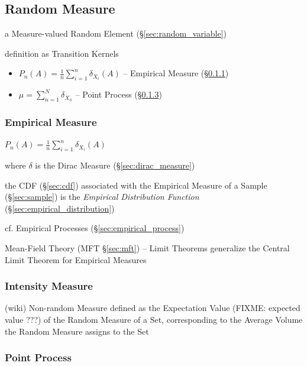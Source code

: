 \subsection{Random Measure}\label{sec:random_measure}

a Measure-valued Random Element (\S\ref{sec:random_variable})

definition as Transition Kernels

\begin{itemize}
  \item $P_n(A) = \frac{1}{n}\sum_{i=1}^n \delta_{X_i}(A)$ --
    Empirical Measure (\S\ref{sec:empirical_measure})
  \item $\mu = \sum_{n=1}^N \delta_{X_n}$ -- Point Process
    (\S\ref{sec:point_process})
\end{itemize}



\subsubsection{Empirical Measure}\label{sec:empirical_measure}

$P_n(A) = \frac{1}{n}\sum_{i=1}^n \delta_{X_i}(A)$

where $\delta$ is the Dirac Measure (\S\ref{sec:dirac_measure})

the CDF (\S\ref{sec:cdf}) associated with the Empirical Measure of a Sample
(\S\ref{sec:sample}) is the \emph{Empirical Distribution Function}
(\S\ref{sec:empirical_distribution})

cf. Empirical Processes (\S\ref{sec:empirical_process})

\fist Mean-Field Theory (MFT \S\ref{sec:mft}) -- Limit Theorems generalize the
Central Limit Theorem for Empirical Measures



\subsubsection{Intensity Measure}\label{sec:intensity_measure}

(wiki) Non-random Measure defined as the Expectation Value (FIXME: expected
value ???) of the Random Measure of a Set, corresponding to the Average Volume
the Random Measure assigns to the Set



\subsubsection{Point Process}\label{sec:point_process}


